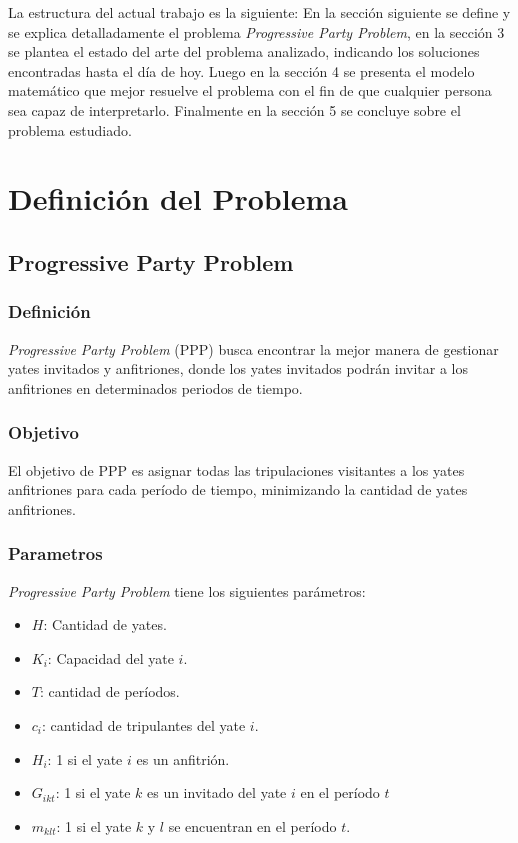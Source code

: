 \documentclass[letter, 10pt]{article}
\begin{document}
La estructura del actual trabajo es la siguiente: En la sección siguiente se define y se explica detalladamente el problema \textit{Progressive Party Problem}, en la sección 3 se plantea el estado del arte del problema analizado, indicando los soluciones encontradas hasta el día de hoy. Luego en la sección 4 se presenta el modelo matemático que mejor resuelve el problema con el fin de que cualquier persona sea capaz de interpretarlo. Finalmente en la sección 5 se concluye sobre el problema estudiado.

\section{Definición del Problema}
\subsection{Progressive Party Problem}
\subsubsection{Definición}
\textit{Progressive Party Problem} (PPP) busca encontrar la mejor manera de gestionar yates invitados y anfitriones, donde los yates invitados podrán invitar a los anfitriones en determinados periodos de tiempo. 

\subsubsection{Objetivo}
El objetivo de PPP es asignar todas las tripulaciones visitantes a los yates anfitriones para cada período de tiempo, minimizando la cantidad de yates anfitriones.

\subsubsection{Parametros}
\textit{Progressive Party Problem} tiene los siguientes parámetros:

\begin{itemize}
\item $H$: Cantidad de yates.
\item $K_i$: Capacidad del yate $i$.
\item $T$: cantidad de períodos.
\item $c_i$: cantidad de tripulantes del yate $i$.
\item $H_i$: 1 si el yate $i$ es un anfitrión.
\item $G_{ikt}$: 1 si el yate $k$ es un invitado del yate $i$ en el período $t$
\item $m_{klt}$:  1 si el yate $k$ y $l$ se encuentran en el período $t$.
\end{itemize}
\end{document}

